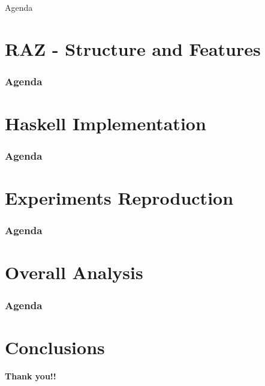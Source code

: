\documentclass{beamer}
\begin{document}
\begin{frame}{Agenda}
  \section{RAZ - Structure and Features}
  \tableofcontents[currentsection]
\end{frame}

\begin{frame}
  \frametitle{Agenda}
  \section{Haskell Implementation}
  \tableofcontents[currentsection]
\end{frame}

\begin{frame}
  \frametitle{Agenda}
  \section{Experiments Reproduction}
  \tableofcontents[currentsection]
\end{frame}

\begin{frame}
  \frametitle{Agenda}
  \section{Overall Analysis}
  \tableofcontents[currentsection]
\end{frame}

\begin{frame}
  \frametitle{Agenda}
  \section{Conclusions}
  \tableofcontents[currentsection]
\end{frame}


\begin{frame}
  \begin{center}
    \textbf{\huge{Thank you!!}}
    \end{center}
\end{frame}
\end{document}
